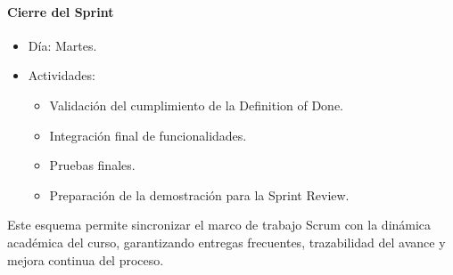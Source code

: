 \documentclass[12pt]{article}
\begin{document}
\paragraph{Cierre del Sprint}

\begin{itemize}
    \item Día: Martes.
    \item Actividades:
    \begin{itemize}
        \item Validación del cumplimiento de la Definition of Done.
        \item Integración final de funcionalidades.
        \item Pruebas finales.
        \item Preparación de la demostración para la Sprint Review.
    \end{itemize}
\end{itemize}



Este esquema permite sincronizar el marco de trabajo Scrum con la dinámica académica del curso, garantizando entregas frecuentes, trazabilidad del avance y mejora continua del proceso.
\end{document}
